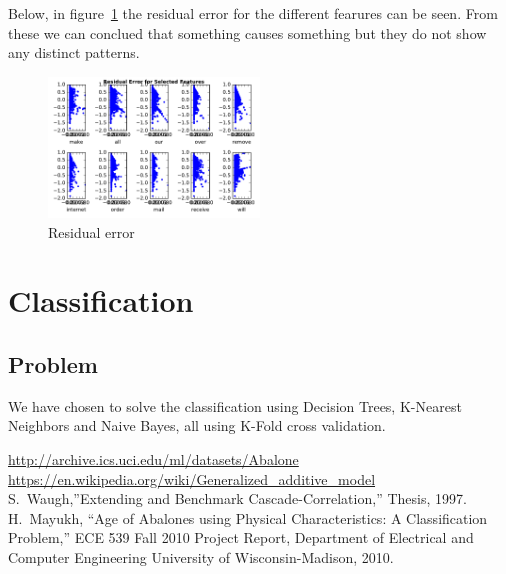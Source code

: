 \documentclass[11pt, paper=a4]{article}
\begin{document}
Below, in figure~\ref{fig:residual-error} the residual error for the different fearures can
be seen. From these we can conclued that something causes something
but they do not show any distinct patterns.

\begin{figure}[h]
  \centering
  \includegraphics[width = 0.5\textwidth]{../../src/img/residual_error.pdf}
  \caption{\label{fig:residual-error} Residual error}
\end{figure}


\clearpage
\section{Classification}

\subsection{Problem}
We have chosen to solve the classification using Decision Trees,
K-Nearest Neighbors and Naive Bayes, all using K-Fold cross
validation.


\clearpage
\begin{thebibliography}{10}
 \url{http://archive.ics.uci.edu/ml/datasets/Abalone}
 \url{https://en.wikipedia.org/wiki/Generalized_additive_model}
 S.~Waugh,''Extending and Benchmark
  Cascade-Correlation,'' Thesis, 1997.
 H.~Mayukh, ``Age of Abalones using Physical
  Characteristics: A Classification Problem,'' ECE 539 Fall 2010
  Project Report, Department of Electrical and Computer Engineering
  University of Wisconsin-Madison, 2010.
\end{thebibliography}
\end{document}

